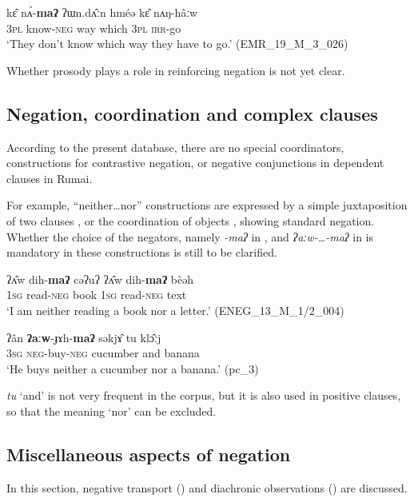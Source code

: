 \documentclass[output=paper,colorlinks,citecolor=brown]{langscibook}
\begin{document}
\ea\label{ex:rum:73}
    \gll kɛ̂	nʌ̀-\textbf{maʔ}	ʔɯn.dʌ̂ːn	hméə	kɛ̂	nʌŋ-hâːw \\
         3\textsc{pl} know\textsc{{}-neg} way which 3\textsc{pl} \textsc{irr-}go \\
    \glt ‘They don’t know which way they have to go.’ (EMR\_19\_M\_3\_026)
\z 

Whether prosody plays a role in reinforcing negation is not yet clear.

\subsection{Negation, coordination and complex clauses} \label{sec:rum:4.5}

According to the present database, there are no special coordinators, constructions for contrastive negation, or negative conjunctions in dependent clauses in Rumai.

For example, “neither…nor” constructions are expressed by a simple juxtaposition of two clauses , or the coordination of objects , showing standard negation. Whether the choice of the negators, namely \textit{{}-maʔ} in , and \textit{ʔaːw-…-maʔ} in  is mandatory in these constructions is still to be clarified.

\ea\label{ex:rum:74}
    \gll ʔʌ̂w	dih-\textbf{maʔ}	cəʔuʔ	ʔʌ̂w	dih-\textbf{maʔ}	bèəh \\
         \textsc{1sg} read-\textsc{neg} book \textsc{1sg} read-\textsc{neg} text\\
    \glt ‘I am neither reading a book nor a letter.’ (ENEG\_13\_M\_1/2\_004)
\z 

\ea\label{ex:rum:75}
    \gll ʔân	\textbf{ʔaːw}-ɟɤh-\textbf{maʔ}	səkjɤ̂	tu	klɔ̂ːj \\
         \textsc{3sg} \textsc{neg}{}-buy-\textsc{neg} cucumber and banana\\
    \glt ‘He buys neither a cucumber nor a banana.’ (pc\_3)
\z 

\textit{tu} ‘and’ is not very frequent in the corpus, but it is also used in positive clauses, so that the meaning ‘nor’ can be excluded.

\subsection{Miscellaneous aspects of negation} \label{sec:rum:4.6}

In this section, negative transport () and diachronic observations () are discussed.
\end{document}
